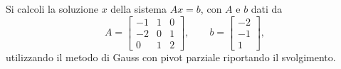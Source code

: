 Si calcoli la soluzione $x$ della sistema $Ax=b$, con $A$ e $b$ 
dati da
\bigskip
\[
A=\left[
\begin{array}{ccc}
-1 & 1 & 0 \\
-2 & 0 & 1\\
0 & 1 & 2
\end{array}\right],\quad \quad
b=\left[
\begin{array}{c}
  -2\\
   -1 \\
   1
\end{array}\right],
\]
utilizzando il metodo di Gauss con pivot parziale riportando il 
svolgimento. 

